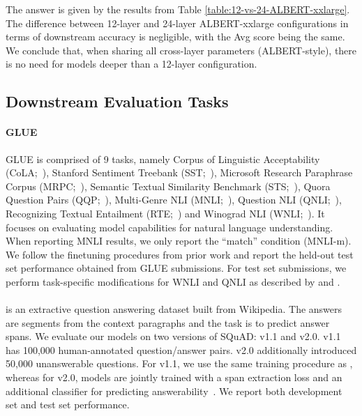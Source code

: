 The answer is given by the results from Table \ref{table:12-vs-24-ALBERT-xxlarge}.
The difference between 12-layer and 24-layer ALBERT-xxlarge configurations in terms of downstream accuracy is negligible, with the Avg score being the same.
We conclude that, when sharing all cross-layer parameters (ALBERT-style), there is no need for models deeper than a 12-layer configuration.

\subsection{Downstream Evaluation Tasks}
\label{downstream_detailed_description}
\paragraph{GLUE} GLUE is comprised of 9 tasks, namely Corpus of Linguistic Acceptability (CoLA;~\citealp{warstadt2018neural}), Stanford Sentiment Treebank (SST;~\citealp{socher-etal-2013-recursive}), Microsoft Research Paraphrase Corpus
(MRPC;~\citealp{dolan-brockett-2005-automatically}), Semantic Textual Similarity Benchmark (STS;~\citealp{cer-etal-2017-semeval}),
Quora Question Pairs (QQP;~\citealp{qqp2016url}), Multi-Genre NLI (MNLI;~\citealp{williams-etal-2018-broad}), Question NLI (QNLI;~\citealp{rajpurkar-etal-2016-squad}), Recognizing Textual
Entailment (RTE;~\citealp{dagan2005pascal,bar2006second,giampiccolo-etal-2007-third,bentivogli2009fifth}) and
Winograd NLI (WNLI;~\citealp{levesque2012winograd}). It focuses on evaluating model capabilities for natural language understanding. 
When reporting MNLI results, we only report the ``match'' condition (MNLI-m). We follow the finetuning procedures from prior work \citep{devlin2018bert, liu2019roberta, yang2019xlnet} and report the held-out test set performance obtained from GLUE submissions. For test set submissions, we perform task-specific modifications for WNLI and QNLI as described by \cite{liu2019roberta} and \cite{yang2019xlnet}. 

\paragraph{\squad} \squad is an extractive question answering dataset built from Wikipedia. The answers are segments from the context paragraphs and the task is to predict answer spans. We evaluate our models on two versions of SQuAD: v1.1 and v2.0. \squad v1.1 has 100,000 human-annotated question/answer pairs. \squad v2.0 additionally introduced 50,000 unanswerable questions. For \squad v1.1, we use the same training procedure as \bert, whereas for \squad v2.0, models are jointly trained with a span extraction loss and an additional classifier for predicting answerability~\citep{yang2019xlnet,liu2019roberta}. We report both development set and test set performance.

